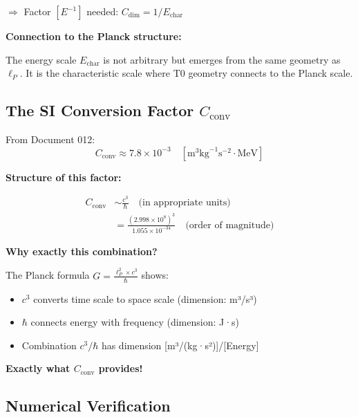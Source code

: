 	$\Rightarrow$ Factor $[E^{-1}]$ needed: $C_{\text{dim}} = 1/E_{\text{char}}$
	
	\textbf{Connection to the Planck structure:}
	
	The energy scale $E_{\text{char}}$ is not arbitrary but emerges from the same geometry as $\ell_P$. It is the characteristic scale where T0 geometry connects to the Planck scale.
	
	\subsection{The SI Conversion Factor $C_{\text{conv}}$}
	
	From Document 012:
	\begin{equation}
		C_{\text{conv}} \approx 7.8 \times 10^{-3} \quad [\text{m}^3 \text{kg}^{-1} \text{s}^{-2} \cdot \text{MeV}]
	\end{equation}
	
	\textbf{Structure of this factor:}
	
	\begin{align}
		C_{\text{conv}} &\sim \frac{c^3}{\hbar} \quad \text{(in appropriate units)} \\
		&= \frac{(2.998 \times 10^8)^3}{1.055 \times 10^{-34}} \quad \text{(order of magnitude)}
	\end{align}
	
	\textbf{Why exactly this combination?}
	
	The Planck formula $G = \frac{\ell_P^2 \times c^3}{\hbar}$ shows:
	\begin{itemize}
		\item $c^3$ converts time scale to space scale (dimension: m³/s³)
		\item $\hbar$ connects energy with frequency (dimension: J·s)
		\item Combination $c^3/\hbar$ has dimension [m³/(kg·s²)]/[Energy]
	\end{itemize}
	
	\textbf{Exactly what $C_{\text{conv}}$ provides!}
	
	\subsection{Numerical Verification}
	
